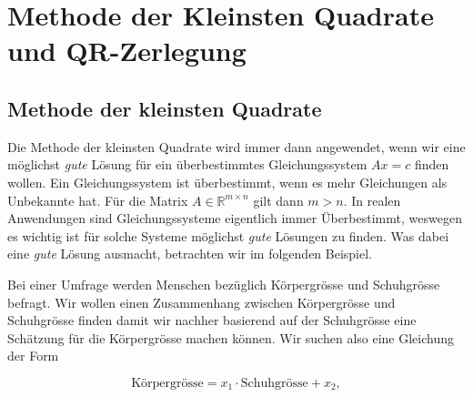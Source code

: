 \setcounter{section}{8}
\section{Methode der Kleinsten Quadrate und QR-Zerlegung}

\subsection{Methode der kleinsten Quadrate}

Die Methode der kleinsten Quadrate wird immer dann angewendet, wenn wir eine möglichst \textit{gute} Lösung für ein überbestimmtes Gleichungssystem \( Ax = c\) finden wollen. Ein Gleichungssystem ist überbestimmt, wenn es mehr Gleichungen als Unbekannte hat. Für die Matrix \( A \in \mathbb{R}^{m \times n} \) gilt dann \(m > n \). In realen Anwendungen sind Gleichungssysteme eigentlich immer Überbestimmt, weswegen es wichtig ist für solche Systeme möglichst \textit{gute} Lösungen zu finden. Was dabei eine \textit{gute} Lösung ausmacht, betrachten wir im folgenden Beispiel. 

\vspace{1\baselineskip}

Bei einer Umfrage werden Menschen bezüglich Körpergrösse und Schuhgrösse befragt. Wir wollen einen Zusammenhang zwischen Körpergrösse und Schuhgrösse finden damit wir nachher basierend auf der Schuhgrösse eine Schätzung für die Körpergrösse machen können. Wir suchen also eine Gleichung der Form

\begin{figure*}[h]
    \centering
    \begin{minipage}
        {0.45\textwidth}
        \begin{equation*}
            \text{Körpergrösse} = x_1\cdot \text{Schuhgrösse} + x_2,
        \end{equation*}        
    \end{minipage}
    \hfill
    \begin{minipage}
        {0.45\textwidth}
        \centering
    \end{minipage}
\end{figure*}
    


